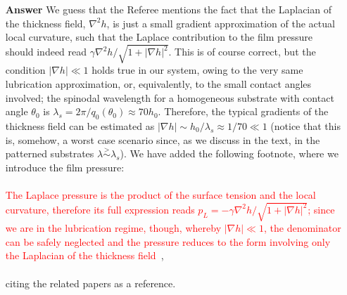 \documentclass[12pt,english]{article}
\begin{document}
\begin{itemize}
\item[ \textbf{{Answer}}]
{
We guess that the Referee mentions the fact that the Laplacian of the thickness field, $\nabla^2 h$,
is just a small gradient approximation of the actual local curvature, such that the Laplace contribution to the film pressure should indeed read $\gamma \nabla^2 h/\sqrt{1+|\nabla h|^2}$. This is of course correct, but 
the condition $|\nabla h| \ll 1$ holds true in our system, owing to the very same lubrication approximation,
or, equivalently, to the small contact angles involved; the spinodal wavelength for a homogeneous substrate with
contact angle $\theta_0$ is $\lambda_s = 2\pi/q_0(\theta_0) \approx 70 h_0$. Therefore, the typical gradients
of the thickness field can be estimated as $|\nabla h| \sim h_0/\lambda_s \approx 1/70 \ll 1$ (notice 
that this is, somehow, a worst case scenario since, as we discuss in the text, in the patterned substrates
$\lambda \stackrel{>}{\sim} \lambda_s$).
We have added the following footnote, where we introduce the film pressure:\\
\\
\textcolor{red}{The Laplace pressure is the product of the surface tension 
and the local curvature, therefore its full expression reads $p_L = -\gamma \nabla^2 h/\sqrt{1+|\nabla h|^2}$; 
since we are in the lubrication regime, though, whereby $|\nabla h| \ll 1$, the denominator can be safely neglected 
and the pressure reduces to the form involving only the Laplacian of the thickness field~\cite{Benet2014,juanes2018}}, \\
\\
citing the related papers as a reference.
}
\end{itemize}




\end{document}
